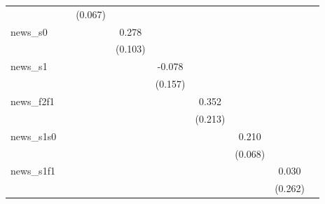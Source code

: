 {\begin{tabular}{l*{8}{c}}
            &                     &     (0.067)         &                     &                     &                     &                     &                     &                     \\
\addlinespace
news\_s0     &                     &                     &       0.278\sym{**} &                     &                     &                     &                     &                     \\
            &                     &                     &     (0.103)         &                     &                     &                     &                     &                     \\
\addlinespace
news\_s1     &                     &                     &                     &      -0.078         &                     &                     &                     &                     \\
            &                     &                     &                     &     (0.157)         &                     &                     &                     &                     \\
\addlinespace
news\_f2f1   &                     &                     &                     &                     &       0.352         &                     &                     &                     \\
            &                     &                     &                     &                     &     (0.213)         &                     &                     &                     \\
\addlinespace
news\_s1s0   &                     &                     &                     &                     &                     &       0.210\sym{***}&                     &                     \\
            &                     &                     &                     &                     &                     &     (0.068)         &                     &                     \\
\addlinespace
news\_s1f1   &                     &                     &                     &                     &                     &                     &       0.030         &                     \\
            &                     &                     &                     &                     &                     &                     &     (0.262)         &                     \\

\end{tabular}}

